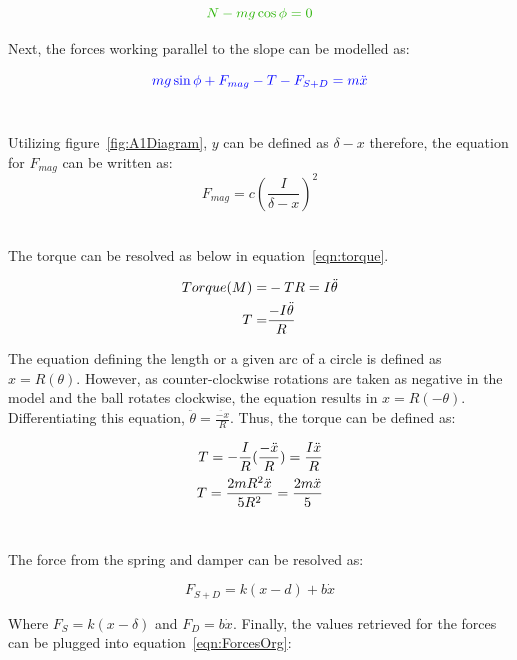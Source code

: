 \documentclass[a4paper,10pt,reqno]{amsart}
\numberwithin{equation}{section}
\begin{document}
\begin{equation}
    \color{darkGreen}{N-mg\cos{\phi}=0}\color{black}
\end{equation}


\par Next, the forces working parallel to the slope can be modelled as:

\begin{equation}
\label{eqn:ForcesOrg}
    \color{blue}{mg\sin{\phi}+F_{mag}-T-F_{S+D}=m\ddot{x}}\color{black}
\end{equation}
\\
\par Utilizing figure~\ref{fig:A1Diagram}, $y$ can be defined as $\delta-x$ therefore, the equation for $F_{mag}$ can be written as:
\begin{equation}
    F_{mag} = c(\frac{I}{\delta-x})^2
\end{equation}
\\
\par The torque can be resolved as below in equation~\ref{eqn:torque}.

\begin{align}
    Torque(M)=&-TR=I\ddot{\theta}
    \notag\\
    T =& \frac{-I\ddot{\theta}}{R}
    \label{eqn:torque}
\end{align}

The equation defining the length or a given arc of a circle is defined as $x=R(\theta)$. However, as counter-clockwise rotations are taken as negative in the model and the ball rotates clockwise, the equation results in  $x=R(-\theta)$. Differentiating this equation, $\ddot{\theta}=\frac{\ddot{-x}}{R}$. Thus, the torque can be defined as:

\begin{align}
    T=-\frac{I}{R}(\frac{-\ddot{x}}{R}) = \frac{I\ddot{x}}{R}
    \notag\\
    T = \frac{2mR^2\ddot{x}}{5R^2} = \frac{2m\ddot{x}}{5}
\end{align}
\\
\par The force from the spring and damper can be resolved as:

\begin{equation}
    F_{S+D}=k(x-d)+b\dot{x}
\end{equation}

\par Where $F_{S}=k(x-\delta)$ and $F_D=b\dot{x}$. Finally, the values retrieved for the forces can be plugged into equation~\ref{eqn:ForcesOrg}:
\end{document}

